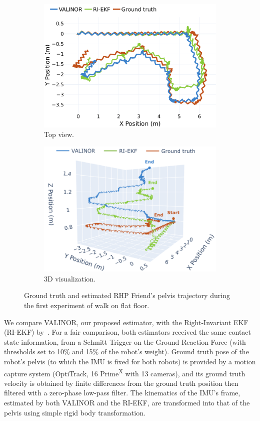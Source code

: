 \documentclass{IJCAS}
\begin{document}
\begin{figure}[htbp]
  \centering
  \begin{subfigure}{\linewidth}
    \centering
    \includegraphics[width=0.85\linewidth]{Uploaded/Images/trajectory_rhps1.pdf}
    \caption{Top view.}
    \label{fig:top}
  \end{subfigure}
  \begin{subfigure}{\linewidth}
    \centering
    \includegraphics[width=0.9\linewidth]{Uploaded/Images/trajectory_rhps1_3d.png}
    \caption{3D visualization.}
    \label{fig:side}
  \end{subfigure}
  \caption{Ground truth and estimated RHP Friend's pelvis trajectory during the first experiment of walk on flat floor.}
  \label{fig:combined}
\end{figure}

\noindent We compare VALINOR, our proposed estimator, with the Right-Invariant EKF (RI-EKF) by~\cite{Hartley2020RIEKF}. For a fair comparison, both estimators received the same contact state information, from a Schmitt Trigger on the Ground Reaction Force (with thresholds set to 10\% and 15\% of the robot's weight).
Ground truth pose of the robot's pelvis (to which the IMU is fixed for both robots) is provided by a motion capture system (OptiTrack, 16 Prime\textsuperscript{X} with 13 cameras), and its ground truth velocity is obtained by finite differences from the ground truth position then filtered with a zero-phase low-pass filter. The kinematics of the IMU's frame, estimated by both VALINOR and the RI-EKF, are transformed into that of the pelvis using simple rigid body transformation.
\end{document}
